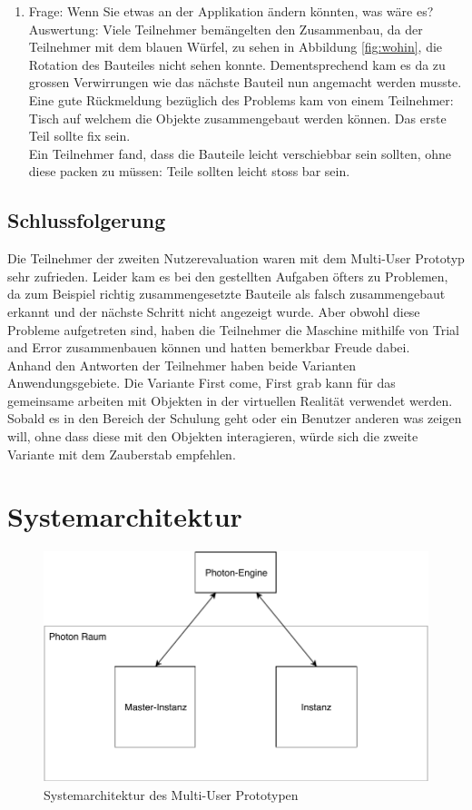 \begin{enumerate} [itemsep=1pt,topsep=0pt]
	\item Frage: Wenn Sie etwas an der Applikation ändern könnten, was wäre es? \\
	Auswertung: Viele Teilnehmer bemängelten den Zusammenbau, da der Teilnehmer mit dem blauen Würfel, zu sehen in Abbildung \ref{fig:wohin}, die Rotation des Bauteiles nicht sehen konnte. Dementsprechend kam es da zu grossen Verwirrungen wie das nächste Bauteil nun angemacht werden musste. Eine gute Rückmeldung bezüglich des Problems kam von einem Teilnehmer: \grqq Tisch auf welchem die Objekte zusammengebaut werden können. Das erste Teil sollte fix sein.\grqq{} \\
	Ein Teilnehmer fand, dass die Bauteile leicht verschiebbar sein sollten, ohne diese packen zu müssen: \grqq Teile sollten leicht stoss bar sein.\grqq{}
\end{enumerate}

\pagebreak
\subsection{Schlussfolgerung}
Die Teilnehmer der zweiten Nutzerevaluation waren mit dem Multi-User Prototyp sehr zufrieden. Leider kam es bei den gestellten Aufgaben öfters zu Problemen, da zum Beispiel richtig zusammengesetzte Bauteile als falsch zusammengebaut erkannt und der nächste Schritt nicht angezeigt wurde. Aber obwohl diese Probleme aufgetreten sind, haben die Teilnehmer die Maschine mithilfe von \grqq Trial and Error\grqq{} zusammenbauen können und hatten bemerkbar Freude dabei. \\

\noindent Anhand den Antworten der Teilnehmer haben beide Varianten Anwendungsgebiete. Die Variante \grqq First come, First grab\grqq{} kann für das gemeinsame arbeiten mit Objekten in der virtuellen Realität verwendet werden. Sobald es in den Bereich der Schulung geht oder ein Benutzer anderen was zeigen will, ohne dass diese mit den Objekten interagieren, würde sich die zweite Variante mit dem Zauberstab empfehlen.

\section{Systemarchitektur}
\begin{figure}[h!]
	\centering
	\includegraphics[keepaspectratio,width=0.60\linewidth]{img/ArchitekturT2.pdf}
	\caption{Systemarchitektur des Multi-User Prototypen}
	\label{fig:systemarchitektur_mutli_user}
\end{figure}


